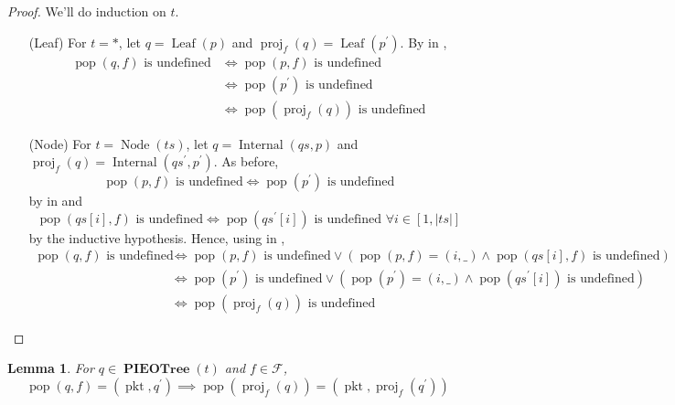 \documentclass{amsart}
\DeclareMathOperator{\pkt}{\mathrm{pkt}}
\DeclareMathOperator{\pop}{\mathrm{pop}}
\DeclareMathOperator{\proj}{\mathrm{proj}}
\DeclareMathOperator{\PIEOTree}{\mathbf{PIEOTree}}
\DeclareMathOperator{\Leaf}{\mathrm{Leaf}}
\DeclareMathOperator{\Internal}{\mathrm{Internal}}
\DeclareMathOperator{\Node}{\mathrm{Node}}
\newtheorem{lem}[thm]{Lemma}
\theoremstyle{definition}
\begin{document}
\begin{proof}
    We'll do induction on $t$.
    \begin{itemize}
        \item[(Leaf)] For $t = \ast$, let $q = \Leaf(p)$ and $\proj_f(q) = \Leaf(p^\prime)$.
            By  in ,
            \begin{align*}
                \pop(q, f) \text{ is undefined} &\iff \pop(p, f) \text{ is undefined} \\
                                                &\iff \pop(p^\prime) \text{ is undefined} \\
                                                &\iff \pop(\proj_f(q)) \text{ is undefined}
            \end{align*}

        \item[(Node)] For $t = \Node(ts)$, let $q = \Internal(qs, p)$ and $\proj_f(q) = \Internal(qs^\prime, p^\prime)$.
            As before, 
            $$\pop(p, f) \text{ is undefined} \iff \pop(p^\prime) \text{ is undefined}$$
            by  in  and 
            $$\pop(qs[i], f) \text{ is undefined} \iff \pop(qs^\prime[i]) \text{ is undefined $\forall i \in [1, |ts|]$}$$
            by the inductive hypothesis.
            Hence, using  in , 
            \begin{align*}
                \pop(q, f) \text{ is undefined} &\iff \pop(p, f) \text{ is undefined} \lor (\pop(p, f) = (i, \_) \land \pop(qs[i], f) \text{ is undefined})\\
                                                &\iff \pop(p^\prime) \text{ is undefined} \lor (\pop(p^{\prime}) = (i, \_) \land \pop(qs^{\prime}[i]) \text{ is undefined})\\
                                                &\iff \pop(\proj_f(q)) \text{ is undefined}
            \end{align*}
    \end{itemize}
\end{proof}

\begin{lem}
    \label{lem:pop}
    For $q \in \PIEOTree(t)$ and $f \in \mathcal F$, 
    $$
        \pop(q, f) = (\pkt, q^\prime) \implies \pop(\proj_f(q)) = (\pkt, \proj_f(q^\prime))
    $$
\end{lem}
\end{document}
